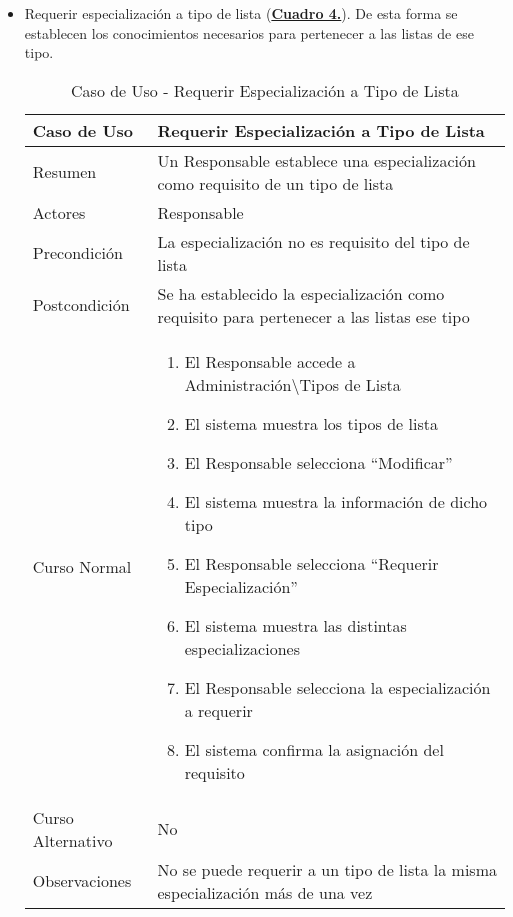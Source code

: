 \begin{itemize}
  \newpage~
	\item \addtocounter{tabla}{1} Requerir especialización a tipo de lista (\textbf{\hyperref[tab:curRequerirEspecTipoLst]{Cuadro 4.}}). De esta forma se establecen los conocimientos necesarios para pertenecer a las listas de ese tipo.
		\begin{table}[!htbp]
		  \centering  \addtocounter{casouso}{1}
		  \begin{tabular}{|l | p{100mm}|}
		    \textbf{Caso de Uso}  & \textbf{Requerir Especialización a Tipo de Lista} \\ \hline
		    Resumen 		 & Un Responsable establece una especialización como requisito de un tipo de lista \\ \hline
		    Actores  		 & Responsable \\ \hline
		    Precondición  	 & La especialización no es requisito del tipo de lista  \\ \hline
		    Postcondición  	 & Se ha establecido la especialización como requisito para pertenecer a las listas ese tipo \\ \hline
		    Curso Normal   	 & \begin{enumerate}
			  \item El Responsable accede a Administración\textbackslash Tipos de Lista
			  \item El sistema muestra los tipos de lista
			  \item El Responsable selecciona ``Modificar''
			  \item El sistema muestra la información de dicho tipo
			  \item El Responsable selecciona ``Requerir Especialización''
			  \item El sistema muestra las distintas especializaciones
			  \item El Responsable selecciona la especialización a requerir
			  \item El sistema confirma la asignación del requisito
		    \end{enumerate}  \\ \hline
		    Curso Alternativo  & No  \\ \hline
		    Observaciones 	 & No se puede requerir a un tipo de lista la misma especialización más de una vez  \\ \hline
		  \end{tabular}
		  \caption{Caso de Uso  - Requerir Especialización a Tipo de Lista}
		  \label{tab:curRequerirEspecTipoLst}
		\end{table}
		\FloatBarrier
\end{itemize}

